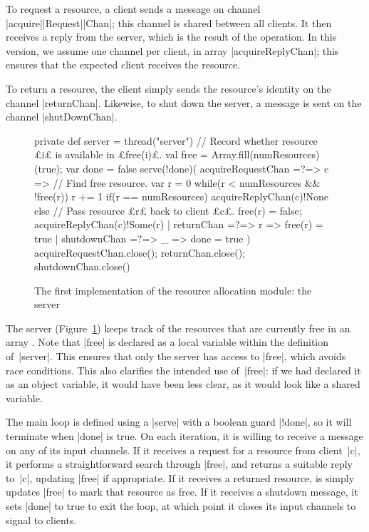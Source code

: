 
To request a resource, a client sends a message on channel
|acquire|\-|Request|\-|Chan|; this channel is shared between all clients.  It
then receives a reply from the server, which is the result of the operation.
In this version, we assume one channel per client, in array
|acquireReplyChan|; this ensures that the expected client receives the
resource.

To return a resource, the client simply sends the resource's identity on the
channel |returnChan|.  Likewise, to shut down the server, a message is sent on
the channel |shutDownChan|.


\begin{figure}
\begin{scala}
  private def server = thread("server"){
    // Record whether resource £i£ is available in £free(i)£.
    val free = Array.fill(numResources)(true); var done = false
    serve(!done)(
      acquireRequestChan =?=> { c => 
	// Find free resource.
	var r = 0
	while(r < numResources && !free(r)) r += 1
	if(r == numResources) acquireReplyChan(c)!None
        else{  // Pass resource £r£ back to client £c£.
	  free(r) = false; acquireReplyChan(c)!Some(r)
        }
      }
      | returnChan =?=> { r => free(r) = true }
      | shutdownChan =?=> { _ => done = true }
    )
    acquireRequestChan.close(); returnChan.close(); shutdownChan.close()
  }
\end{scala}
\caption{The first implementation of the resource allocation module: the
  server}
\label{fig:RAServer1-2}
\end{figure}


The server (Figure~\ref{fig:RAServer1-2}) keeps track of the resources that are
currently free in an array .  Note that |free| is declared as a
local variable within the definition of~|server|.  This ensures that only the
server has access to |free|, which avoids race conditions. This also clarifies
the intended use of~|free|: if we had declared it as an object variable, it
would have been less clear, as it would look like a shared variable.

The main loop is defined using a |serve| with a boolean guard |!done|, so it
will terminate when |done| is true.  On each iteration, it is willing to
receive a message on any of its input channels.  If it receives a request for
a resource from client~|c|, it performs a straightforward search through
|free|, and returns a suitable reply to~|c|, updating |free| if appropriate.
If it receives a returned resource, is simply updates |free| to mark that
resource as free.  If it receives a shutdown message, it sets |done| to true
to exit the loop, at which point it closes its input channels to signal to
clients.

